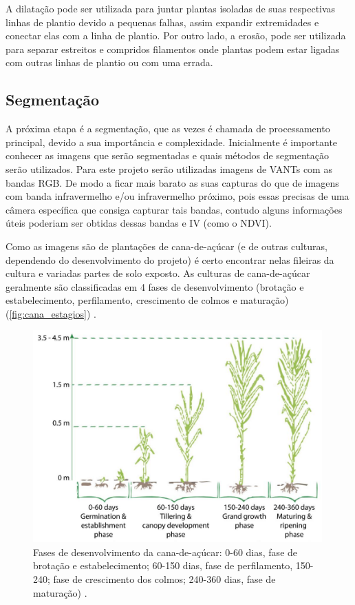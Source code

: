 \documentclass[12pt, a4paper, english, brazil]{article}
\begin{document}
A dilatação pode ser utilizada para juntar plantas isoladas de suas respectivas linhas de plantio devido a pequenas falhas, assim expandir extremidades e conectar elas com a linha de plantio. Por outro lado, a erosão, pode ser utilizada para separar estreitos e compridos filamentos onde plantas podem estar ligadas com outras linhas de plantio ou com uma errada.

\subsection{Segmentação}

A próxima etapa é a segmentação, que as vezes é chamada de processamento principal, devido a sua importância e complexidade. Inicialmente é importante conhecer as imagens que serão segmentadas e quais métodos de segmentação serão utilizados. Para este projeto serão utilizadas imagens de VANTs com as bandas RGB. De modo a ficar mais barato as suas capturas do que de imagens com banda infravermelho e/ou infravermelho próximo, pois essas precisas de uma câmera específica que consiga capturar tais bandas, contudo alguns informações úteis poderiam ser obtidas dessas bandas e IV (como o NDVI).

Como as imagens são de plantações de cana-de-açúcar (e de outras culturas, dependendo do desenvolvimento do projeto) é certo encontrar nelas fileiras da cultura e variadas partes de solo exposto. As culturas de cana-de-açúcar geralmente são classificadas em 4 fases de desenvolvimento (brotação e estabelecimento, perfilamento, crescimento de colmos e maturação) (\autoref{fig:cana_estagios}) \cite{Lu_Zhou_2019}.

\begin{figure}[htbp]
    \centering
    \includegraphics[width=0.99\textwidth]{img/cana_estagios.jpg}
    \caption{Fases de desenvolvimento da cana-de-açúcar: 0-60 dias, fase de brotação e estabelecimento; 60-150 dias, fase de perfilamento, 150-240; fase de crescimento dos colmos; 240-360 dias, fase de maturação) \cite{Molijn_2019}.}
    \label{fig:cana_estagios}
\end{figure}
\end{document}
